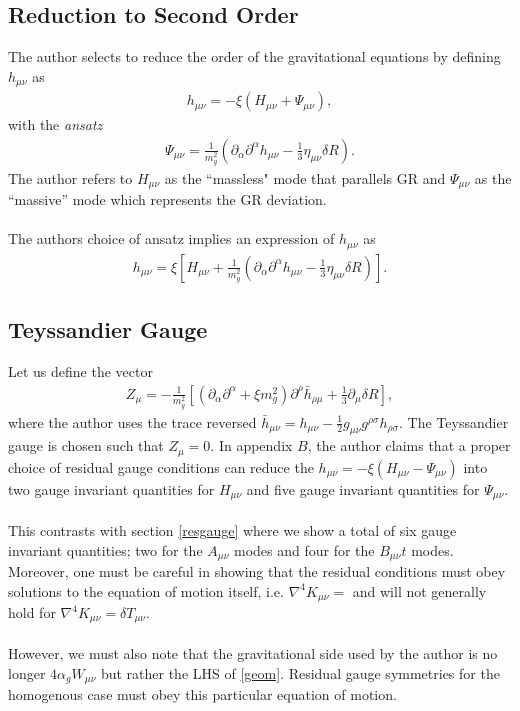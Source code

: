 \documentclass[10pt,letterpaper]{article}
\numberwithin{equation}{subsection}
\begin{document}
\subsection{Reduction to Second Order}
The author selects to reduce the order of the gravitational equations by defining $h_{\mu\nu}$ as
\begin{eqnarray}
h_{\mu\nu} =  -\xi \left( H_{\mu\nu} + \Psi_{\mu\nu}\right),
\end{eqnarray}
with the \emph{ansatz}
\begin{eqnarray}
\Psi_{\mu\nu} = \frac{1}{m^2_g}\left( \partial_\alpha \partial^\alpha h_{\mu\nu} - \frac13 \eta_{\mu\nu}\delta R\right).
\end{eqnarray}
The author refers to $H_{\mu\nu}$ as the ``massless" mode that parallels GR and $\Psi_{\mu\nu}$ as the ``massive'' mode which represents the GR deviation. 
\\ \\
The authors choice of ansatz implies an expression of $h_{\mu\nu}$ as
\begin{eqnarray}
h_{\mu\nu} = \xi\left[H_{\mu\nu} + \frac{1}{m_g^2} \left( \partial_\alpha \partial^\alpha h_{\mu\nu} - \frac13 \eta_{\mu\nu}\delta R\right)\right].
\end{eqnarray}


\subsection{Teyssandier Gauge}
Let us define the vector
\begin{eqnarray}
Z_\mu = -\frac{1}{m_g^2} \left[ (\partial_\alpha\partial^\alpha + \xi m_g^2) \partial^\rho \bar h_{\rho\mu} + \frac13 \partial_\mu \delta R\right],
\end{eqnarray}
where the author uses the trace reversed $\bar h_{\mu\nu} = h_{\mu\nu}- \frac12 g_{\mu\nu}g^{\rho\sigma}h_{\rho\sigma}$.
The Teyssandier gauge is chosen such that $Z_\mu = 0$. In appendix $B$, the author claims that a proper choice of residual gauge conditions can reduce the $h_{\mu\nu} = -\xi(H_{\mu\nu} - \Psi_{\mu\nu})$ into two gauge invariant quantities for $H_{\mu\nu}$ and five gauge invariant quantities for $\Psi_{\mu\nu}$.
\\ \\
This contrasts with section \ref{resgauge} where we  show a total of six gauge invariant quantities; two for the $A_{\mu\nu}$ modes and four for the $B_{\mu\nu} t$ modes. Moreover, one must be careful in showing that the residual conditions must obey solutions to the equation of motion itself, i.e. $\nabla^4 K_{\mu\nu} =$ and will not generally hold for $\nabla^4 K_{\mu\nu} = \delta T_{\mu\nu}$. 
\\ \\
However, we must also note that the gravitational side used by the author is no longer $4\alpha_g W_{\mu\nu}$ but rather
the LHS of \eqref{geom}. Residual gauge symmetries for the homogenous case must obey this particular equation of motion. 
\end{document}
